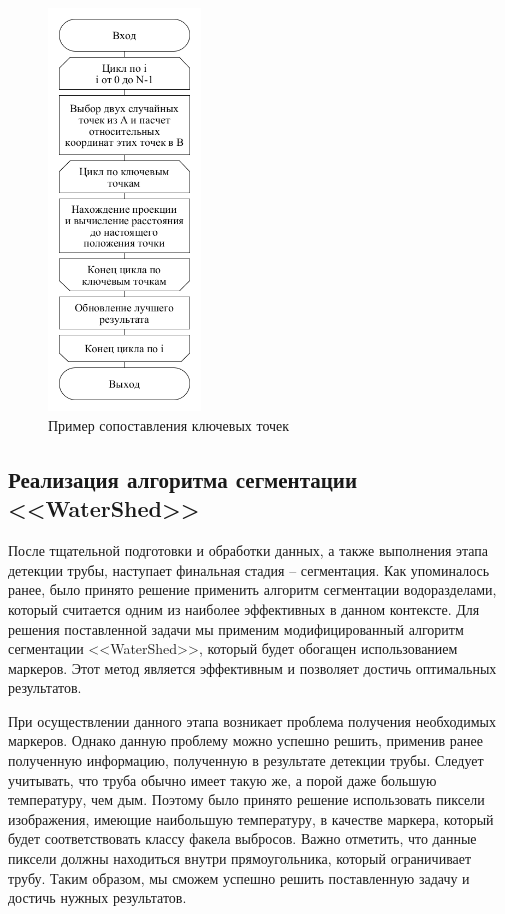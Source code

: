 \documentclass[14pt, a4paper]{extreport}
\begin{document}
	\begin{figure}[h!]
		\centering
		\includegraphics[width = 0.36\textwidth]{image/chapter_3/RanSaC}	
		\caption{Пример сопоставления ключевых точек}
		\label{fig:RanSaC}
	\end{figure}
	
\subsection[Реализация алгоритма сегментации <<WaterShed>>]{Реализация алгоритма сегментации <<WaterShed>>}
	После тщательной подготовки и обработки данных, а также выполнения этапа детекции трубы, наступает финальная стадия -- сегментация. Как упоминалось ранее, было принято решение применить алгоритм сегментации водоразделами, который считается одним из наиболее эффективных в данном контексте. Для решения поставленной задачи мы применим модифицированный алгоритм сегментации <<WaterShed>>, который будет обогащен использованием маркеров. Этот метод является эффективным и позволяет достичь оптимальных результатов.
	
	При осуществлении данного этапа возникает проблема получения необходимых маркеров. Однако данную проблему можно успешно решить, применив ранее полученную информацию, полученную в результате детекции трубы. Следует учитывать, что труба обычно имеет такую же, а порой даже большую температуру, чем дым. Поэтому было принято решение использовать пиксели изображения, имеющие наибольшую температуру, в качестве маркера, который будет соответствовать классу факела выбросов. Важно отметить, что данные пиксели должны находиться внутри прямоугольника, который ограничивает трубу. Таким образом, мы сможем успешно решить поставленную задачу и достичь нужных результатов.
	
\end{document}
